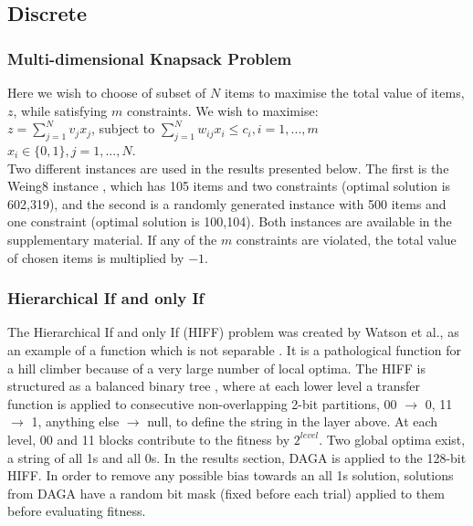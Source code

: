 \documentclass[runningheads,a4paper]{llncs}
\begin{document}
\subsection{Discrete}
\subsubsection{Multi-dimensional Knapsack Problem}
Here we wish to choose of subset of \(N\) items to maximise the total value of items, \(z\), while satisfying \(m\) constraints. We wish to maximise:
\vspace{2mm}\\
\(z = \sum_{j=1}^{N} v_jx_j\), subject to \(\sum_{j=1}^{N} w_{ij}x_i \leq c_i, i = 1, ..., m\)
\vspace{2mm}\\
\(x_i \in \{0,1\}, j = 1, ..., N\).
\vspace{2mm}\\
Two different instances are used in the results presented below. The first is the Weing8 instance \cite{ref}, which has 105 items and two constraints (optimal solution is 602,319), and the second is a randomly generated instance with 500 items and one constraint (optimal solution is 100,104). Both instances are available in the supplementary material. If any of the \(m\) constraints are violated, the total value of chosen items is multiplied by \(-1\).

\subsubsection{Hierarchical If and only If}

The Hierarchical If and only If (HIFF) problem was created by Watson et al., as an example of a function which is not separable \cite{ref}. It is a pathological function for a hill climber because of a very large number of local optima. The HIFF is structured as a balanced binary tree \cite{hboa}, where at each lower level a transfer function is applied to consecutive non-overlapping 2-bit partitions, 00 \(\rightarrow\) 0, 11 \(\rightarrow\) 1, anything else \(\rightarrow\) null, to define the string in the layer above. At each level, 00 and 11 blocks contribute to the fitness by \(2^{level}\). Two global optima exist, a string of all 1s and all 0s. In the results section, DAGA is applied to the 128-bit HIFF. In order to remove any possible bias towards an all 1s solution, solutions from DAGA have a random bit mask (fixed before each trial) applied to them before evaluating fitness.
\end{document}
